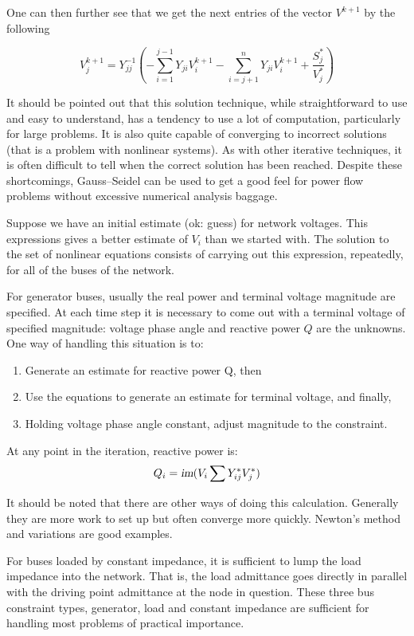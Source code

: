 One can then further see that we get the next entries of the vector $V^{k+1}$ by the following 

$$
V_j^{k+1}=Y_{jj}^{-1}(-\sum_{i=1}^{j-1} Y_{ji}V_i^{k+1}-\sum_{i=j+1}^n Y_{ji}V_i^{k+1}+\frac{S_j^*}{V_j^*})
$$

It should be pointed out that this solution technique, while straightforward to use and easy to understand, has a tendency to use a lot of computation, particularly for large problems. It is also quite capable of converging to incorrect solutions (that is a problem with nonlinear systems). As with other iterative techniques, it is often difficult to tell when the correct solution has been reached. Despite these shortcomings, Gauss–Seidel can be used to get a good feel for power flow problems without excessive numerical analysis baggage.


Suppose we have an initial estimate (ok: guess) for network voltages. This expressions gives a better estimate of $V_i$ than we started with. The solution to the set of nonlinear equations consists of carrying out this expression, repeatedly, for all of the buses of the network.


For generator buses, usually the real power and terminal voltage magnitude are specified. At each time step it is necessary to come out with a terminal voltage of specified magnitude: voltage phase angle and reactive power $Q$ are the unknowns. One way of handling this situation is to:
\begin{enumerate}

\item Generate an estimate for reactive power Q, then
\item Use the equations to generate an estimate for terminal voltage, and finally,
\item Holding voltage phase angle constant, adjust magnitude to the constraint.

\end{enumerate}
At any point in the iteration, reactive power is:
\[Q_i=\textsl{im}{(V_i\sum Y^*_{ij}V_j^*)}\]

It should be noted that there are other ways of doing this calculation. Generally they are more work to set up but often converge more quickly. Newton’s method and variations are good examples.

For buses loaded by constant impedance, it is sufficient to lump the load impedance into the network. That is, the load admittance goes directly in parallel with the driving point admittance at the node in question.
These three bus constraint types, generator, load and constant impedance are sufficient for handling most problems of practical importance.
